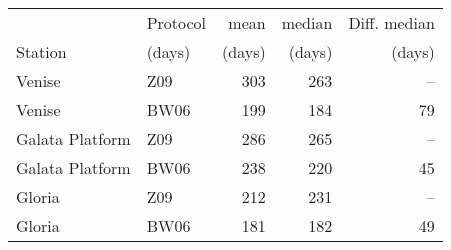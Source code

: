 \documentclass[preview]{standalone}
\begin{document}

\begin{tabular}{llrrr}
\hline
         & Protocol   &    mean &   median &   Diff. median \\
Station & (days)      & (days)  & (days)   & (days)    \\ 
\hline
Venise          & Z09      & 303 &    263   &           --   \\
Venise          & BW06       & 199 &    184   &          79   \\\hline
Galata Platform & Z09      & 286 &    265   &           --   \\
Galata Platform & BW06       & 238  &    220   &          45   \\\hline
Gloria          & Z09      & 212 &    231 &           --   \\
Gloria          & BW06       & 181 &    182   &          49 \\
\hline
\end{tabular}
\end{document}

